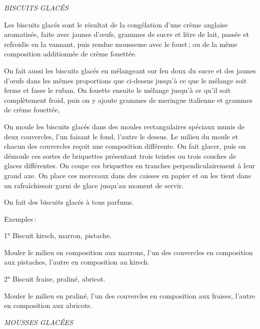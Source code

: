 \bigskip

\begin{center}
\textit{BISCUITS GLACÉS}
\end{center}

\bigskip

Les biscuits glacés sont le résultat de la congélation d'une crème anglaise
aromatisée, faite avec {\mmm} jaunes d'œufs, {\mmm} grammes de
sucre et {\mmm} litre de lait, passée et refroidie en la vannant, puis
rendue mousseuse avec le fouet ; ou de la même composition additionnée de crème
fouettée.

On fait aussi les biscuits glacés en mélangeant sur feu doux du sucre et des
jaunes d'œufs dans les mêmes proportions que ci-dessus jusqu'à ce que le
mélange soit ferme et fasse le ruban. On fouette ensuite le mélange jusqu'à ce
qu'il soit complètement froid, puis on y ajoute {\mmm} grammes de
meringue italienne et {\mmm} grammes de crème fouettée,

On moule les biscuits glacés dans des moules rectangulaires spéciaux munis de
deux couvercles, l'un faisant le fond, l'autre le dessus. Le milieu du moule et
chacun des couvercles reçoit une composition différente. On fait glacer, puis on
démoule ces sortes de briquettes présentant trois teintes ou trois couches de glaces
différentes. On coupe ces briquettes en tranches perpendiculairement à leur grand
axe. On place ces morceaux dans des caisses en papier et on les tient dans un
rafraîchissoir garni de glace jusqu'au moment de servir.

On fait des biscuits glacés à tous parfums.

Exemples :

\medskip

1° Biscuit kirsch, marron, pistache.

Mouler le milieu en composition aux marrons, l'un des couvercles en composition
aux pistaches, l’autre en composition au kirsch.

2° Biscuit fraise, praliné, abricot.

Mouler le milieu en praliné, l'un des couvercles en composition aux fraises,
l’autre en composition aux abricots.

\bigskip

\begin{center}
\textit{MOUSSES GLACÉES}
\end{center}

